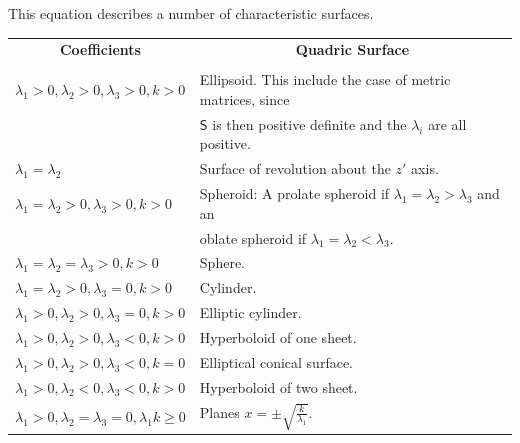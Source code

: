 \documentclass{article}
\theoremstyle{plain}\theoremheaderfont{\normalfont\itshape}\theorembodyfont{\rmfamily}\theoremseparator{.}\newtheorem*{rem}{Remark}\newtheorem*{ex}{Example}\newtheorem*{proof}{Proof}\newtheorem*{altp}{Alternative proof}
\theoremstyle{plain}\theoremheaderfont{\normalfont\bfseries}\theorembodyfont{\rmfamily}\theoremseparator{.}\newtheorem{thm}{Theorem}[section]\newtheorem{lem}[thm]{Lemma}\newtheorem{prop}[thm]{Proposition}\newtheorem*{cor}{Corollary}\newtheorem{defn}[thm]{Definition}\newtheorem{clm}[thm]{Claim}\newtheorem{clminproof}{Claim}
\theoremstyle{break}\theoremheaderfont{\normalfont\itshape}\theorembodyfont{\rmfamily}\theoremseparator{.\medskip}\newtheorem*{proofskip}{Proof}\newtheorem*{exs}{Examples}\newtheorem*{rems}{Remarks}
\theoremstyle{break}\theoremheaderfont{\normalfont\bfseries}\theorembodyfont{\rmfamily}\theoremseparator{.\medskip}\newtheorem{lemskip}[thm]{Lemma}\newtheorem{defnskip}[thm]{Definition}\newtheorem{propskip}[thm]{Proposition}\newtheorem{thmskip}[thm]{Theorem}
\numberwithin{equation}{section}
\begin{document}
	This equation describes a number of characteristic surfaces.
	
	\begin{table}[ht!]
		\centering
		\begin{tabular}{ll}
			\multicolumn{1}{c}{\textbf{Coefficients}} & \multicolumn{1}{c}{\textbf{Quadric Surface}}\\
				& \\
			\(\lambda_1>0,\lambda_2>0,\lambda_3>0,k>0\) & Ellipsoid. This include the case of metric matrices, since\\
				& \(\mathsf{S}\) is then positive definite and the \(\lambda_i\) are all positive.\\[5pt]
			\(\lambda_1=\lambda_2\) & Surface of revolution about the \(z'\) axis.\\[5pt]
			\(\lambda_1=\lambda_2>0,\lambda_3>0,k>0\) & Spheroid: A prolate spheroid if \(\lambda_1=\lambda_2>\lambda_3\) and an\\
				& oblate spheroid if \(\lambda_1=\lambda_2<\lambda_3\).\\[5pt]
			\(\lambda_1=\lambda_2=\lambda_3>0,k>0\) & Sphere.\\[5pt]
			\(\lambda_1=\lambda_2>0,\lambda_3=0,k>0\) & Cylinder. \\[5pt]
			\(\lambda_1>0,\lambda_2>0,\lambda_3=0,k>0\) & Elliptic cylinder. \\[5pt]
			\(\lambda_1>0,\lambda_2>0,\lambda_3<0,k>0\) & Hyperboloid of one sheet. \\[5pt]
			\(\lambda_1>0,\lambda_2>0,\lambda_3<0,k=0\) & Elliptical conical surface. \\[5pt]
			\(\lambda_1>0,\lambda_2<0,\lambda_3<0,k>0\) & Hyperboloid of two sheet. \\[5pt]
			\(\lambda_1>0,\lambda_2=\lambda_3=0,\lambda_1k\ge0\) & Planes \(x=\pm\sqrt{\frac{k}{\lambda_1}}\). \\[5pt]
		\end{tabular}
	\end{table}
	
\end{document}
